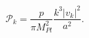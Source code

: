 \begin{equation}\label{eq:power-exp}
  \mathcal{P}_k=\frac{p}{\pi M_{Pl}^2}\frac{k^3|v_k|^2}{a^2}.
\end{equation}

